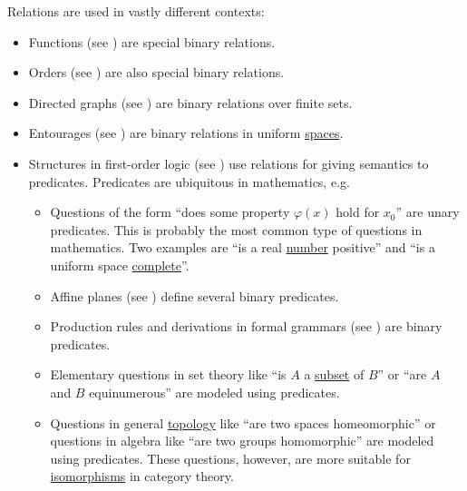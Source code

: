 \begin{example}\label{ex:relation}
  Relations are used in vastly different contexts:
  \begin{itemize}
    \item Functions (see ) are special binary relations.
    \item Orders (see ) are also special binary relations.
    \item Directed graphs (see ) are binary relations over finite sets.
    \item Entourages (see ) are binary relations in uniform \hyperref[def:uniform_space]{spaces}.
    \item Structures in first-order logic (see ) use relations for giving semantics to predicates. Predicates are ubiquitous in mathematics, e.g.
    \begin{itemize}
      \item Questions of the form \enquote{does some property \( \varphi(x) \) hold for \( x_0 \)} are unary predicates. This is probably the most common type of questions in mathematics. Two examples are \enquote{is a real \hyperref[def:real_numbers]{number} positive} and \enquote{is a uniform space \hyperref[def:complete_uniform_space]{complete}}.
      \item Affine planes (see ) define several binary predicates.
      \item Production rules and derivations in formal grammars (see ) are binary predicates.
      \item Elementary questions in set theory like \enquote{is \( A \) a \hyperref[def:subset]{subset} of \( B \)} or \enquote{are \( A \) and \( B \) equinumerous} are modeled using predicates.
      \item Questions in general \hyperref[sec:general_topology]{topology} like \enquote{are two spaces homeomorphic} or questions in algebra like \enquote{are two groups homomorphic} are modeled using predicates. These questions, however, are more suitable for \hyperref[def:morphism_invertibility/isomorphism]{isomorphisms} in category theory.
    \end{itemize}
  \end{itemize}
\end{example}

